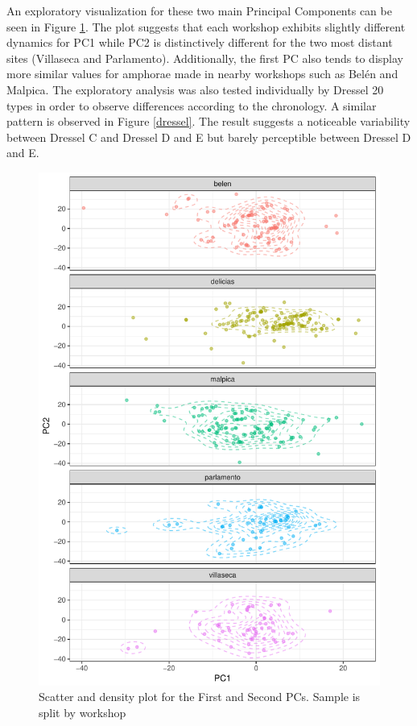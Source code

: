 \documentclass[review]{elsarticle}
\begin{document}
An exploratory visualization for these two main Principal Components can be seen in Figure \ref{pca}. The plot suggests that each workshop exhibits slightly different dynamics for PC1 while PC2 is distinctively different for the two most distant sites (Villaseca and Parlamento). Additionally, the first PC also tends to display more similar values for amphorae made in nearby workshops such as Bel\'en and Malpica. The exploratory analysis was also tested individually by Dressel 20 types in order to observe differences according to the chronology. A similar pattern is observed in Figure \ref{dressel}. The result suggests  a noticeable variability between Dressel C and Dressel D and E but barely perceptible between Dressel D and E.

\begin{figure}[htp]
	\centering
\includegraphics[width=\linewidth]{figs/pca}
\caption{Scatter and density plot for the First and Second PCs. Sample is split by workshop}
\label{pca}
\end{figure} 
\end{document}
